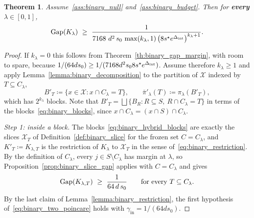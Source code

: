 \documentclass[aos]{imsart}%
\newcommand{\ambientspace}[0]{\mathcal{X}}
\theoremstyle{plain}
\newtheorem{theorem}{Theorem}[section]
\theoremstyle{definition}
\begin{document}
    \begin{theorem}
        \label{th:binary_gap_hybrid}
        Assume~\ref{ass:binary_null}
        and~\ref{ass:binary_budget}. Then for \textbf{every} $\lambda\in[0,1]$,
        \begin{equation}
            \label{eq:binary_hybrid}
            \mathrm{Gap}(K_\lambda)\ \geq\
            \frac{1}{7168\ d^{2}\,s_0\,\max(k_\lambda,1)\,
            \bigl(8s^{\star}e^{\Delta_{\mathrm{int}}}\bigr)^{k_\lambda+1}} .
        \end{equation}
    \end{theorem}

    \begin{proof}
        If $k_\lambda=0$ this follows from
        Theorem~\ref{th:binary_gap_margin}, with room to spare, because
        $1/(64ds_0)\geq1/(7168d^{2}s_08s^{\star}e^{\Delta_{\mathrm{int}}})$. Assume
        therefore $k_\lambda\geq1$ and apply
        Lemma~\ref{lemma:binary_decomposition} to the partition of
        $\ambientspace$ indexed by $T\subseteq C_\lambda$,
        \begin{equation}
            \label{eq:binary_hybrid_blocks}
            B'_T\coloneq\{x\in\ambientspace:x\cap C_\lambda=T\},
            \qquad
            \bar\pi'_\lambda(T)\coloneq\pi_\lambda(B'_T),
        \end{equation}
        which has $2^{k_\lambda}$ blocks. Note that
        $B'_T=\bigsqcup\{B_R:R\subseteq S,\ R\cap C_\lambda=T\}$ in terms of
        the blocks~\eqref{eq:binary_blocks}, since $x\cap
        C_\lambda=(x\cap S)\cap C_\lambda$.

        \emph{Step 1: inside a block.} The blocks~\eqref{eq:binary_hybrid_blocks}
        are exactly the slices $\ambientspace_T$ of
        Definition~\ref{def:binary_slice} for the frozen set $C=C_\lambda$, and
        $K'_T\coloneq K_{\lambda,T}$ is the restriction of $K_\lambda$ to
        $\ambientspace_T$ in the sense of~\eqref{eq:binary_restriction}. By the
        definition of $C_\lambda$, every $j\in S\setminus C_\lambda$ has margin
        at $\lambda$, so Proposition~\ref{prop:binary_slice_gap} applies with
        $C=C_\lambda$ and gives
        \begin{equation*}
            \Gap(K_{\lambda,T})\ \geq\ \frac{1}{64\,d\,s_0}
            \qquad\text{for every }T\subseteq C_\lambda .
        \end{equation*}
        By the last claim of Lemma~\ref{lemma:binary_restriction}, the first
        hypothesis of~\eqref{eq:binary_two_poincare} holds with
        $\gamma_{\mathrm{in}}=1/(64ds_0)$.


\end{proof}
\end{document}
